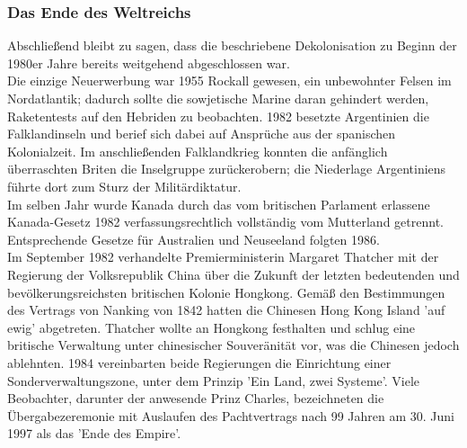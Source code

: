 \documentclass[letterpaper, 12pt]{article}
\let\tempsubsubsection\subsubsection
\renewcommand\subsubsection[1]{\vspace{0cm}\tempsubsubsection{#1}\vspace{0cm}}
\begin{document}
\subsubsection{Das Ende des Weltreichs}

Abschließend bleibt zu sagen, dass die beschriebene Dekolonisation zu Beginn der 1980er Jahre bereits weitgehend abgeschlossen war. \\
Die einzige Neuerwerbung war 1955 Rockall gewesen, ein unbewohnter Felsen im Nordatlantik; dadurch sollte die sowjetische Marine daran gehindert werden, Raketentests auf den Hebriden zu beobachten. 1982 besetzte Argentinien die Falklandinseln und berief sich dabei auf Ansprüche aus der spanischen Kolonialzeit. Im anschließenden Falklandkrieg konnten die anfänglich überraschten Briten die Inselgruppe zurückerobern; die Niederlage Argentiniens führte dort zum Sturz der Militärdiktatur. \\
Im selben Jahr wurde Kanada durch das vom britischen Parlament erlassene Kanada-Gesetz 1982 verfassungsrechtlich vollständig vom Mutterland getrennt. Entsprechende Gesetze für Australien und Neuseeland folgten 1986. \\
Im September 1982 verhandelte Premierministerin Margaret Thatcher mit der Regierung der Volksrepublik China über die Zukunft der letzten bedeutenden und bevölkerungsreichsten britischen Kolonie Hongkong. Gemäß den Bestimmungen des Vertrags von Nanking von 1842 hatten die Chinesen Hong Kong Island 'auf ewig' abgetreten. Thatcher wollte an Hongkong festhalten und schlug eine britische Verwaltung unter chinesischer Souveränität vor, was die Chinesen jedoch ablehnten. 1984 vereinbarten beide Regierungen die Einrichtung einer Sonderverwaltungszone, unter dem Prinzip 'Ein Land, zwei Systeme'. Viele Beobachter, darunter der anwesende Prinz Charles, bezeichneten die Übergabezeremonie mit Auslaufen des Pachtvertrags nach 99 Jahren am 30. Juni 1997 als das 'Ende des Empire'.

\clearpage


\end{document}
